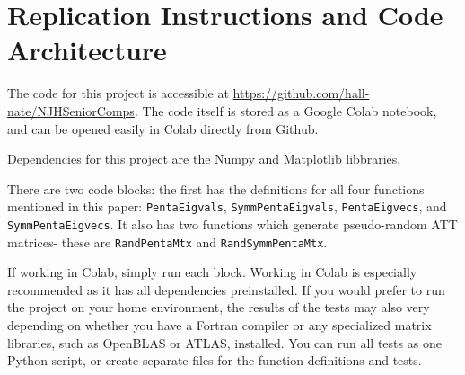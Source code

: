 \documentclass[10pt,twocolumn]{article}
\begin{document}
\appendix
\section{Replication Instructions and Code Architecture}

The code for this project is accessible at \url{https://github.com/hall-nate/NJHSeniorComps}. The code itself is stored as a Google Colab notebook, and can be opened easily in Colab directly from Github. 

Dependencies for this project are the Numpy and Matplotlib libbraries.

There are two code blocks: the first has the definitions for all four functions mentioned in this paper: \verb|PentaEigvals|, \verb|SymmPentaEigvals|, \verb|PentaEigvecs|, and \verb|SymmPentaEigvecs|. It also has two functions which generate pseudo-random ATT matrices- these are \verb|RandPentaMtx| and \verb|RandSymmPentaMtx|. 

If working in Colab, simply run each block. Working in Colab is especially recommended as it has all dependencies preinstalled. If you would prefer to run the project on your home environment, the results of the tests may also very depending on whether you have a Fortran compiler or any specialized matrix libraries, such as OpenBLAS or ATLAS, installed. You can run all tests as one Python script, or create separate files for the function definitions and tests.
 
\printbibliography
\end{document}
